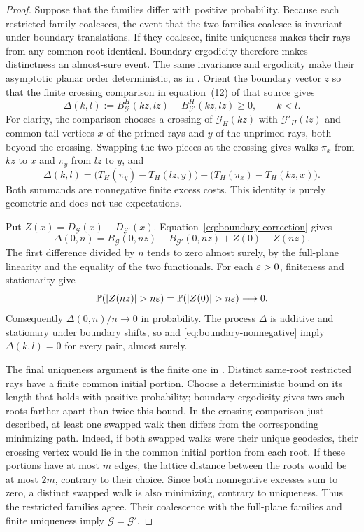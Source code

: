 \begin{proof}
Suppose that the families differ with positive probability. Because
each restricted family coalesces, the event that the two families
coalesce is invariant under boundary translations. If they coalesce,
finite uniqueness makes their rays from any common root identical.
Boundary ergodicity therefore makes distinctness an almost-sure event.
The same invariance and ergodicity make their asymptotic planar order
deterministic, as in \cite[Section~4.5]{AhlbergHoffman}. Orient the boundary
vector \(z\) so that the finite crossing comparison in equation~(12)
of that source gives
\begin{equation}\label{eq:boundary-nonnegative}
 \Delta(k,l):=B_{\mathcal G}^H(kz,lz)
             -B_{\mathcal G'}^H(kz,lz)\geq0,
 \qquad k<l.
\end{equation}
For clarity, the comparison chooses a crossing of
\(\mathcal G_H(kz)\) with \(\mathcal G'_H(lz)\) and common-tail
vertices \(x\) of the primed rays and \(y\) of the unprimed rays,
both beyond the crossing.
Swapping the two pieces at the crossing gives walks \(\pi_x\) from
\(kz\) to \(x\) and \(\pi_y\) from \(lz\) to \(y\), and
\[
 \Delta(k,l)
 =\bigl(T_H(\pi_y)-T_H(lz,y)\bigr)
  +\bigl(T_H(\pi_x)-T_H(kz,x)\bigr).
\]
Both summands are nonnegative finite excess costs. This identity is
purely geometric and does not use expectations.

Put \(Z(x)=D_{\mathcal G}(x)-D_{\mathcal G'}(x)\).
Equation~\eqref{eq:boundary-correction} gives
\[
 \Delta(0,n)=B_{\mathcal G}(0,nz)-B_{\mathcal G'}(0,nz)
                    +Z(0)-Z(nz).
\]
The first difference divided by \(n\) tends to zero almost surely,
by the full-plane linearity and the equality of the two functionals.
For each \(\varepsilon>0\), finiteness and stationarity give
\[
 \PP(|Z(nz)|>n\eps)=\PP(|Z(0)|>n\eps)\longrightarrow0.
\]
Consequently \(\Delta(0,n)/n\to0\) in probability. The process
\(\Delta\) is additive and stationary under boundary shifts, so
 and
\eqref{eq:boundary-nonnegative} imply \(\Delta(k,l)=0\) for every
pair, almost surely.

The final uniqueness argument is the finite one in
\cite[Section~4.5]{AhlbergHoffman}. Distinct same-root restricted
rays have a finite common initial portion. Choose a deterministic
bound on its length that holds with positive probability; boundary
ergodicity gives two such roots farther apart than twice this bound.
In the crossing comparison just described, at least one swapped walk
then differs from the corresponding minimizing path. Indeed, if both
swapped walks were their unique geodesics, their crossing vertex would
lie in the common initial portion from each root. If these portions
have at most \(m\) edges, the lattice distance between the roots would
be at most \(2m\), contrary to their choice. Since both nonnegative
excesses sum to zero, a distinct swapped walk is also minimizing,
contrary to uniqueness. Thus the restricted families
agree. Their coalescence with the full-plane families and finite
uniqueness imply \(\mathcal G=\mathcal G'\).
\end{proof}

